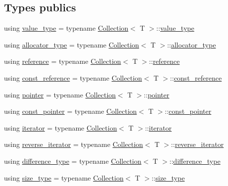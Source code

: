 \subsection*{Types publics}
\begin{DoxyCompactItemize}
\item 
using \hyperlink{class_filtered_collection_a70364ecb37ecfcc313cea1e3dee900da}{value\+\_\+type} = typename \hyperlink{class_collection}{Collection}$<$ T $>$\+::\hyperlink{class_collection_a30ecb2b5696f341f4b751019679c41e0}{value\+\_\+type}
\item 
using \hyperlink{class_filtered_collection_a89348fde51fe48c6528e5ac5abe72c6d}{allocator\+\_\+type} = typename \hyperlink{class_collection}{Collection}$<$ T $>$\+::\hyperlink{class_collection_ac7974b0b552f0a94065aadc48ae53397}{allocator\+\_\+type}
\item 
using \hyperlink{class_filtered_collection_afc4e47695287b6bac73899ab5bcfdf6e}{reference} = typename \hyperlink{class_collection}{Collection}$<$ T $>$\+::\hyperlink{class_collection_abbc291771b11c48cd2f297a0d9fe0449}{reference}
\item 
using \hyperlink{class_filtered_collection_acd1fd308211e928705d0903b749dcaef}{const\+\_\+reference} = typename \hyperlink{class_collection}{Collection}$<$ T $>$\+::\hyperlink{class_collection_abb8c0f6de5e322aa531837aab7358b89}{const\+\_\+reference}
\item 
using \hyperlink{class_filtered_collection_a0c78e02c35e4b712b945a0e5c6b9a14a}{pointer} = typename \hyperlink{class_collection}{Collection}$<$ T $>$\+::\hyperlink{class_collection_a9a5b5d9b389c113364d527900c745efb}{pointer}
\item 
using \hyperlink{class_filtered_collection_af5e238a7b8ed76c864a2c7526b34a71d}{const\+\_\+pointer} = typename \hyperlink{class_collection}{Collection}$<$ T $>$\+::\hyperlink{class_collection_a79ea96d1fa145e340e907547d0053b81}{const\+\_\+pointer}
\item 
using \hyperlink{class_filtered_collection_a65730aaf0a2a5307a924b44672718c74}{iterator} = typename \hyperlink{class_collection}{Collection}$<$ T $>$\+::\hyperlink{class_collection_a317dca4fdf1eb2e47643bb60c620f802}{iterator}
\item 
using \hyperlink{class_filtered_collection_a5b0a5b053f47e55eee9d746d8160664b}{reverse\+\_\+iterator} = typename \hyperlink{class_collection}{Collection}$<$ T $>$\+::\hyperlink{class_collection_ac3805407b2dc537e71db7af070b8d8a6}{reverse\+\_\+iterator}
\item 
using \hyperlink{class_filtered_collection_a98c17401762621a928d2b9926d3b71d6}{difference\+\_\+type} = typename \hyperlink{class_collection}{Collection}$<$ T $>$\+::\hyperlink{class_collection_a60b36ef7aba0a88dff0e98fc2adb98a8}{difference\+\_\+type}
\item 
using \hyperlink{class_filtered_collection_ab527ec70d0bf74af7018c0ca42a6ec8a}{size\+\_\+type} = typename \hyperlink{class_collection}{Collection}$<$ T $>$\+::\hyperlink{class_collection_a3f8b024f587aa20be530866da30948c4}{size\+\_\+type}
\end{DoxyCompactItemize}
